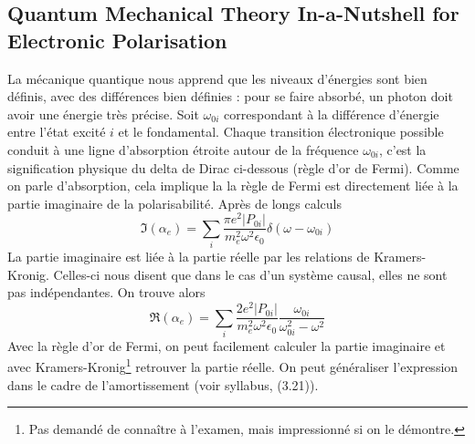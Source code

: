 \subsection{Quantum Mechanical Theory In-a-Nutshell for Electronic Polarisation}
La mécanique quantique nous apprend que les niveaux d'énergies sont bien définis, avec des différences
bien définies : pour se faire absorbé, un photon doit avoir une énergie très précise. Soit $\omega_{0i}$
correspondant à la différence d'énergie entre l'état excité $i$ et le fondamental. Chaque transition électronique possible conduit à une ligne d'absorption étroite autour de la fréquence
$\omega_{0i}$, c'est la signification physique du delta de Dirac ci-dessous (règle d'or de Fermi). Comme
on parle d'absorption, cela implique la la règle de Fermi est directement liée à la partie imaginaire de 
la polarisabilité. Après de longs calculs
\begin{equation}
\Im(\alpha_e) = \sum_i \dfrac{\pi e^2|P_{0i}|}{m_e^2\omega^2\epsilon_0}\delta (\omega-\omega_{0i})
\end{equation}
La partie imaginaire est liée à la partie réelle par les relations de Kramers-Kronig. Celles-ci nous disent
que dans le cas d'un système causal, elles ne sont pas indépendantes. On trouve alors
\begin{equation}
\Re(\alpha_e) = \sum_i\dfrac{2e^2|P_{0i}|}{m_e^2\omega^2\epsilon_0}\dfrac{\omega_{0i}}{\omega_{0i}^2-\omega^2}
\end{equation}
Avec la règle d'or de Fermi, on peut facilement calculer la partie imaginaire et avec Kramers-Kronig\footnote{
Pas demandé de connaître à l'examen, mais impressionné si on le démontre.} retrouver la partie réelle. On 
peut généraliser l'expression dans le cadre de l'amortissement (voir syllabus, (3.21)).




\newpage

